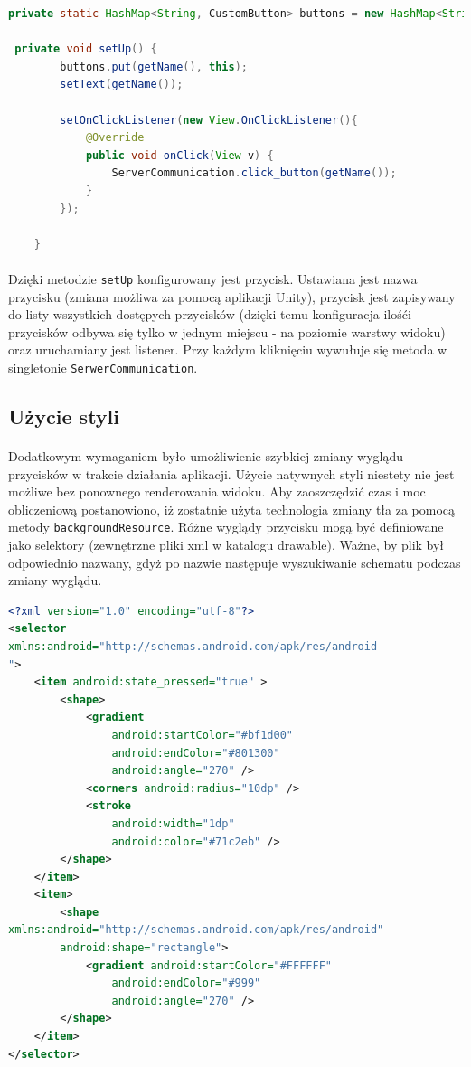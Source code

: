 \begin{lstlisting}[language=Java]
private static HashMap<String, CustomButton> buttons = new HashMap<String, CustomButton>();

 private void setUp() {
        buttons.put(getName(), this);
        setText(getName());

        setOnClickListener(new View.OnClickListener(){
            @Override
            public void onClick(View v) {
                ServerCommunication.click_button(getName());
            }
        });

    }
\end{lstlisting}

\paragraph{}
Dzięki metodzie \texttt{setUp} konfigurowany jest przycisk. Ustawiana jest nazwa przycisku (zmiana możliwa za pomocą aplikacji Unity), przycisk jest zapisywany do listy wszystkich dostępych przycisków (dzięki temu konfiguracja ilośći przycisków odbywa się tylko w jednym miejscu - na poziomie warstwy widoku) oraz uruchamiany jest listener. Przy każdym kliknięciu wywułuje się metoda w singletonie \texttt{SerwerCommunication}.


\subsection{Użycie styli}
\paragraph{}
Dodatkowym wymaganiem było umożliwienie szybkiej zmiany wyglądu przycisków w trakcie działania aplikacji. Użycie natywnych styli niestety nie jest możliwe bez ponownego renderowania widoku. Aby zaoszczędzić czas i moc obliczeniową postanowiono, iż zostatnie użyta technologia zmiany tła za pomocą metody \texttt{backgroundResource}. Różne wyglądy przycisku mogą być definiowane jako selektory (zewnętrzne pliki xml w katalogu drawable). Ważne, by plik był odpowiednio nazwany, gdyż po nazwie następuje wyszukiwanie schematu podczas zmiany wyglądu.

\begin{lstlisting}[language=Xml]
<?xml version="1.0" encoding="utf-8"?>
<selector 
xmlns:android="http://schemas.android.com/apk/res/android
">
    <item android:state_pressed="true" >
        <shape>
            <gradient
                android:startColor="#bf1d00"
                android:endColor="#801300"
                android:angle="270" />
            <corners android:radius="10dp" />
            <stroke
                android:width="1dp"
                android:color="#71c2eb" />
        </shape>
    </item>
    <item>
        <shape 
xmlns:android="http://schemas.android.com/apk/res/android"
        android:shape="rectangle">
            <gradient android:startColor="#FFFFFF"
                android:endColor="#999"
                android:angle="270" />
        </shape>
    </item>
</selector>
\end{lstlisting}

